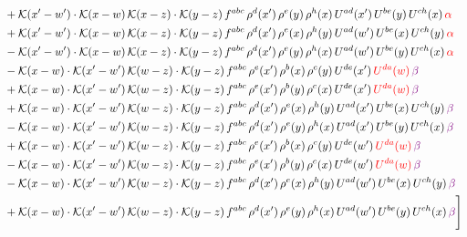 \documentclass[9pt]{article}
\numberwithin{equation}{section}
\begin{document}
\begin{align}
&+\mathcal{K}(x'-w')\cdot\mathcal{K}(x-w)\,\mathcal{K}(x-z)\cdot\mathcal{K}(y-z)\, f^{abc}\,\rho^{d}(x')\,\rho^{e}(y)\,\rho^{h}(x)\,U^{ad}(x')\,U^{be}(y)\,U^{ch}(x)\,{\color{red}\alpha}\notag\\ & +\mathcal{K}(x'-w')\cdot\mathcal{K}(x-w)\,\mathcal{K}(x-z)\cdot\mathcal{K}(y-z)\, f^{abc}\,\rho^{d}(x')\,\rho^{e}(x)\,\rho^{h}(y)\,U^{ad}(w')\,U^{be}(x)\,U^{ch}(y)\,{\color{red}\alpha}\notag\\ & -\mathcal{K}(x'-w')\cdot\mathcal{K}(x-w)\,\mathcal{K}(x-z)\cdot\mathcal{K}(y-z)\, f^{abc}\,\rho^{d}(x')\,\rho^{e}(y)\,\rho^{h}(x)\,U^{ad}(w')\,U^{be}(y)\,U^{ch}(x)\,{\color{red}\alpha}\notag\\ & - \mathcal{K}(x-w) \cdot \mathcal{K}(x'-w')\, \mathcal{K}(w-z)\cdot \mathcal{K}(y-z)\, f^{abc}\, \rho^{e}(x')\,\rho^{b}(x)\,\rho^{c}(y)\,U^{de}(x')\,{\color{red}U^{da}(w)}\,{\color{violet} \beta} \notag \\ &  +  \mathcal{K}(x-w) \cdot \mathcal{K}(x'-w')\, \mathcal{K}(w-z)\cdot \mathcal{K}(y-z)\, f^{abc}\, \rho^{e}(x')\,\rho^{b}(y)\,\rho^{c}(x)\,U^{de}(x')\,{\color{red}U^{da}(w)}\,{\color{violet} \beta} \notag \\ & + \mathcal{K}(x-w) \cdot \mathcal{K}(x'-w')\, \mathcal{K}(w-z)\cdot \mathcal{K}(y-z)\, f^{abc}\, \rho^{d}(x')\,\rho^{e}(x)\,\rho^{h}(y)\,U^{ad}(x')\,U^{be}(x)\,U^{ch}(y)\, {\color{violet} \beta} \notag \\ & - \mathcal{K}(x-w) \cdot \mathcal{K}(x'-w')\, \mathcal{K}(w-z)\cdot \mathcal{K}(y-z)\, f^{abc}\, \rho^{d}(x')\,\rho^{e}(y)\,\rho^{h}(x)\,U^{ad}(x')\,U^{be}(y)\,U^{ch}(x)\, {\color{violet} \beta} \notag \\ & + \mathcal{K}(x-w) \cdot \mathcal{K}(x'-w')\, \mathcal{K}(w-z)\cdot \mathcal{K}(y-z)\, f^{abc}\, \rho^{e}(x')\,\rho^{b}(x)\,\rho^{c}(y)\,U^{de}(w')\,{\color{red}U^{da}(w)}\,{\color{violet} \beta} \notag \\ & - \mathcal{K}(x-w) \cdot \mathcal{K}(x'-w')\, \mathcal{K}(w-z)\cdot \mathcal{K}(y-z)\, f^{abc}\, \rho^{e}(x')\,\rho^{b}(y)\,\rho^{c}(x)\,U^{de}(w')\,{\color{red}U^{da}(w)}\, {\color{violet} \beta} \notag \\ & - \mathcal{K}(x-w) \cdot \mathcal{K}(x'-w')\, \mathcal{K}(w-z)\cdot \mathcal{K}(y-z)\, f^{abc}\, \rho^{d}(x')\,\rho^{e}(x)\,\rho^{h}(y)\,U^{ad}(w')\,U^{be}(x)\,U^{ch}(y)\, {\color{violet} \beta} \notag \\ & + \mathcal{K}(x-w) \cdot \mathcal{K}(x'-w')\, \mathcal{K}(w-z)\cdot \mathcal{K}(y-z)\, f^{abc}\, \rho^{d}(x')\,\rho^{e}(y)\,\rho^{h}(x)\,U^{ad}(w')\,U^{be}(y)\,U^{ch}(x)\, {\color{violet} \beta} \Bigg]
\end{align}
\end{document}
